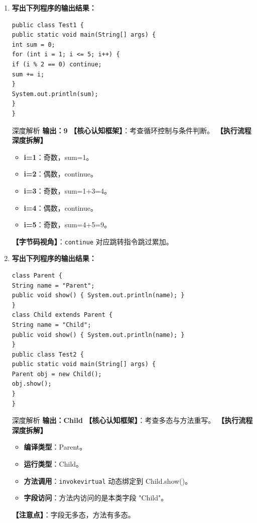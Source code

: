 ﻿\documentclass[12pt, a4paper]{ctexart}
\newcommand{\code}[1]{\texttt{#1}}
\begin{document}
\begin{enumerate}[label=\textbf{\arabic*.}, itemsep=1em]
	\item \textbf{写出下列程序的输出结果：}
	      \begin{lstlisting}[style=JavaExam]
public class Test1 {
public static void main(String[] args) {
int sum = 0;
for (int i = 1; i <= 5; i++) {
if (i % 2 == 0) continue;
sum += i;
}
System.out.println(sum);
}
}
    \end{lstlisting}
	      \begin{bluebox}{深度解析}
		      \textbf{输出：9}
		      \textbf{【核心认知框架】}：考查循环控制与条件判断。
		      \textbf{【执行流程深度拆解】}
		      \begin{itemize}[leftmargin=*, nosep]
			      \item \textbf{i=1}：奇数，sum=1。
			      \item \textbf{i=2}：偶数，continue。
			      \item \textbf{i=3}：奇数，sum=1+3=4。
			      \item \textbf{i=4}：偶数，continue。
			      \item \textbf{i=5}：奇数，sum=4+5=9。
		      \end{itemize}
		      \textbf{【字节码视角】}：\code{continue} 对应跳转指令跳过累加。
	      \end{bluebox}

	\item \textbf{写出下列程序的输出结果：}
	      \begin{lstlisting}[style=JavaExam]
class Parent {
String name = "Parent";
public void show() { System.out.println(name); }
}
class Child extends Parent {
String name = "Child";
public void show() { System.out.println(name); }
}
public class Test2 {
public static void main(String[] args) {
Parent obj = new Child();
obj.show();
}
}
    \end{lstlisting}
	      \begin{bluebox}{深度解析}
		      \textbf{输出：Child}
		      \textbf{【核心认知框架】}：考查多态与方法重写。
		      \textbf{【执行流程深度拆解】}
		      \begin{itemize}[leftmargin=*, nosep]
			      \item \textbf{编译类型}：Parent。
			      \item \textbf{运行类型}：Child。
			      \item \textbf{方法调用}：\code{invokevirtual} 动态绑定到 Child.show()。
			      \item \textbf{字段访问}：方法内访问的是本类字段 "Child"。
		      \end{itemize}
		      \textbf{【注意点】}：字段无多态，方法有多态。
	      \end{bluebox}


\end{enumerate}
\end{document}

